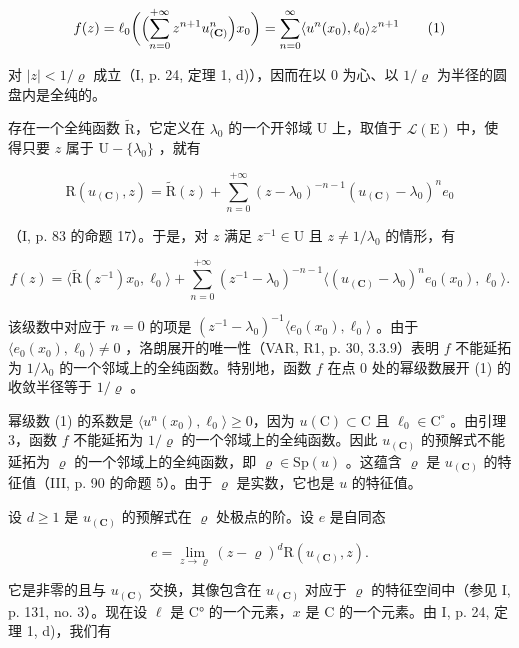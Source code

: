 \[
f (z) = \ell_ {0} \bigg (\Bigl (\sum_ {n = 0} ^ {+ \infty} z ^ {n + 1} u _ {(\mathbf {C})} ^ {n} \Bigr) x _ {0} \bigg) = \sum_ {n = 0} ^ {\infty} \langle u ^ {n} (x _ {0}), \ell_ {0} \rangle z ^ {n + 1}\tag{1}
\]

对 \(|z| < 1 / \varrho\) 成立（I, p. 24, 定理 1, d)），因而在以 0 为心、以 \(1 / \varrho\) 为半径的圆盘内是全纯的。

存在一个全纯函数 \(\widetilde{\mathrm{R}}\)，它定义在 \(\lambda_0\) 的一个开邻域 U 上，取值于 \(\mathcal{L}(\mathrm{E})\) 中，使得只要 \(z\) 属于 \(\mathrm{U} - \{\lambda_0\}\) ，就有

\[
\mathrm{R} (u _ {(\mathbf {C})}, z) = \widetilde {\mathrm{R}} (z) + \sum_ {n = 0} ^ {+ \infty} (z - \lambda_ {0}) ^ {- n - 1} (u _ {(\mathbf {C})} - \lambda_ {0}) ^ {n} e _ {0}
\]

（I, p. 83 的命题 17）。于是，对 \(z\) 满足 \(z^{-1} \in \mathrm{U}\) 且 \(z \neq 1 / \lambda_0\) 的情形，有

\[
f (z) = \langle \widetilde {\mathrm{R}} (z ^ {- 1}) x _ {0}, \ell_ {0} \rangle + \sum_ {n = 0} ^ {+ \infty} (z ^ {- 1} - \lambda_ {0}) ^ {- n - 1} \langle (u _ {(\mathbf {C})} - \lambda_ {0}) ^ {n} e _ {0} (x _ {0}), \ell_ {0} \rangle .
\]

该级数中对应于 \(n=0\) 的项是 \((z^{-1}-\lambda_{0})^{-1}\langle e_{0}(x_{0}),\ell_{0}\rangle\) 。由于 \(\langle e_{0}(x_{0}),\ell_{0}\rangle\neq0\) ，洛朗展开的唯一性（VAR, R1, p. 30, 3.3.9）表明 \(f\) 不能延拓为 \(1/\lambda_{0}\) 的一个邻域上的全纯函数。特别地，函数 \(f\) 在点 0 处的幂级数展开 (1) 的收敛半径等于 \(1/\varrho\) 。

幂级数 (1) 的系数是 \(\langle u^n(x_0),\ell_0\rangle\geqslant 0\)，因为 \(u(\mathrm{C})\subset\mathrm{C}\) 且 \(\ell_{0}\in\mathrm{C}^{\circ}\) 。由引理 3，函数 \(f\) 不能延拓为 \(1/\varrho\) 的一个邻域上的全纯函数。因此 \(u_{(\mathbf{C})}\) 的预解式不能延拓为 \(\varrho\) 的一个邻域上的全纯函数，即 \(\varrho\in\mathrm{Sp}(u)\) 。这蕴含 \(\varrho\) 是 \(u_{(\mathbf{C})}\) 的特征值（III, p. 90 的命题 5）。由于 \(\varrho\) 是实数，它也是 \(u\) 的特征值。

设 \(d \geqslant 1\) 是 \(u_{(\mathbf{C})}\) 的预解式在 \(\varrho\) 处极点的阶。设 \(e\) 是自同态

\[
e = \lim _ {z \to \varrho} (z - \varrho) ^ {d} \mathrm{R} (u _ {(\mathbf {C})}, z).
\]

它是非零的且与 \(u_{(\mathbf{C})}\) 交换，其像包含在 \(u_{(\mathbf{C})}\) 对应于 \(\varrho\) 的特征空间中（参见 I, p. 131, no. 3）。现在设 \(\ell\) 是 C° 的一个元素，\(x\) 是 C 的一个元素。由 I, p. 24, 定理 1, d)，我们有

